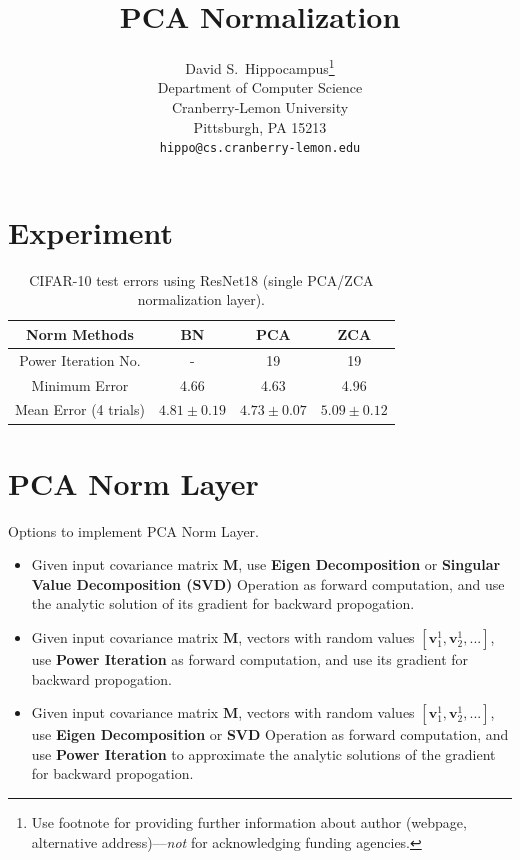 \documentclass{article}
\title{PCA Normalization}
\author{%
  David S.~Hippocampus\thanks{Use footnote for providing further information
    about author (webpage, alternative address)---\emph{not} for acknowledging
    funding agencies.} \\
  Department of Computer Science\\
  Cranberry-Lemon University\\
  Pittsburgh, PA 15213 \\
  \texttt{hippo@cs.cranberry-lemon.edu} \\
}
\newcommand{\bM}{\mathbf{M}}
\newcommand{\bv}{\mathbf{v}}
\begin{document}
\maketitle

\begin{abstract}

\end{abstract}

\section{Experiment}

\begin{table}[!htb]
\begin{centering}
\begin{tabular}{|c|c|c|c|}
\hline
Norm Methods          & BN        & PCA       & ZCA       \\ \hline
Power Iteration No.   & -         & 19        & 19        \\ \hline
Minimum Error         & 4.66      & 4.63      & 4.96      \\ \hline
Mean Error (4 trials) & $4.81 \pm 0.19$ &  $4.73	\pm 0.07$ & $5.09	 \pm 0.12$ \\ \hline
\end{tabular}
\caption{CIFAR-10 test errors using ResNet18 (single PCA/ZCA normalization layer).}
\end{centering}
\end{table}

\section{PCA Norm Layer}
Options to implement PCA Norm Layer.
\begin{itemize}
\item Given input covariance matrix $\bM$, use \textbf{Eigen Decomposition} or \textbf{Singular Value Decomposition (SVD)} Operation as forward computation, and use the analytic solution of its gradient for backward propogation.
\item Given input covariance matrix $\bM$, vectors with random values $[\bv_1^{1}, \bv_2^{1}, ...]$, use \textbf{Power Iteration} as forward computation, and use its gradient for backward propogation.
\item Given input covariance matrix $\bM$, vectors with random values $[\bv_1^{1}, \bv_2^{1}, ...]$, use \textbf{Eigen Decomposition} or \textbf{SVD} Operation as forward computation, and use \textbf{Power Iteration} to approximate the analytic solutions of the gradient for backward propogation.
\end{itemize}
\end{document}
